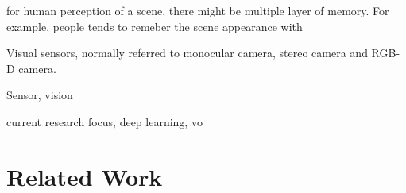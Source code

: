 for human perception 
of a scene, there might be multiple layer of memory. For example, people tends to remeber the scene appearance with 


Visual sensors, normally referred to monocular camera, stereo camera and RGB-D camera. 

Sensor, vision  

current research focus, deep learning, vo 



\section{Related Work}

